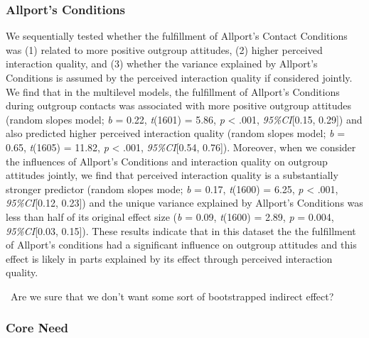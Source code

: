 \documentclass[man, 12pt, a4paper]{apa7}
\theoremstyle{break}
\theoremstyle{plain}
\begin{document}
\subsubsection{Allport's Conditions}

We sequentially tested whether the fulfillment of Allport's Contact
Conditions was (1) related to more positive outgroup attitudes, (2)
higher perceived interaction quality, and (3) whether the variance
explained by Allport's Conditions is assumed by the perceived
interaction quality if considered jointly. We find that in the
multilevel models, the fulfillment of Allport's Conditions during
outgroup contacts was associated with more positive outgroup attitudes
(random slopes model; \textit{b} = 0.22, \textit{t}(1601) = 5.86,
\textit{p} \textless{} .001, \textit{95\%CI}{[}0.15, 0.29{]}) and also
predicted higher perceived interaction quality (random slopes model;
\textit{b} = 0.65, \textit{t}(1605) = 11.82, \textit{p} \textless{}
.001, \textit{95\%CI}{[}0.54, 0.76{]}). Moreover, when we consider the
influences of Allport's Conditions and interaction quality on outgroup
attitudes jointly, we find that perceived interaction quality is a
substantially stronger predictor (random slopes mode; \textit{b} = 0.17,
\textit{t}(1600) = 6.25, \textit{p} \textless{} .001,
\textit{95\%CI}{[}0.12, 0.23{]}) and the unique variance explained by
Allport's Conditions was less than half of its original effect size
(\textit{b} = 0.09, \textit{t}(1600) = 2.89, \textit{p} = 0.004,
\textit{95\%CI}{[}0.03, 0.15{]}). These results indicate that in this
dataset the the fulfillment of Allport's conditions had a significant
influence on outgroup attitudes and this effect is likely in parts
explained by its effect through perceived interaction quality.

\faQuestionCircle~Are we sure that we don't want some sort of
bootstrapped indirect effect?

\subsubsection{Core Need}
\end{document}

